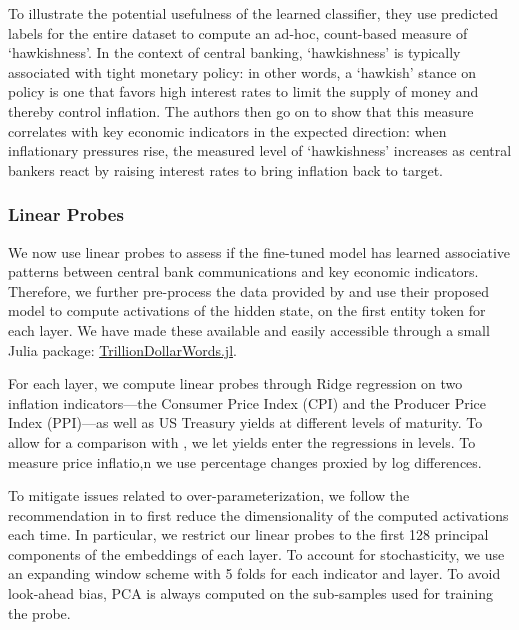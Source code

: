 \documentclass{article}
\theoremstyle{plain}
\theoremstyle{definition}
\theoremstyle{remark}
\begin{document}
To illustrate the potential usefulness of the learned classifier, they use predicted labels for the entire dataset to compute an ad-hoc, count-based measure of `hawkishness'. In the context of central banking, `hawkishness' is typically associated with tight monetary policy: in other words, a `hawkish' stance on policy is one that favors high interest rates to limit the supply of money and thereby control inflation. The authors then go on to show that this measure correlates with key economic indicators in the expected direction: when inflationary pressures rise, the measured level of `hawkishness' increases as central bankers react by raising interest rates to bring inflation back to target.

\subsubsection{Linear Probes}\label{linear-probes}
We now use linear probes to assess if the fine-tuned model has learned associative patterns between central bank communications and key economic indicators. Therefore, we further pre-process the data provided by \citet{shah2023trillion} and use their proposed model to compute activations of the hidden state, on the first entity token for each layer. We have made these available and easily accessible through a small Julia package: \href{https://anonymous.4open.science/r/TrillionDollarWords/README.md}{TrillionDollarWords.jl}. 

For each layer, we compute linear probes through Ridge regression on two inflation indicators---the Consumer Price Index (CPI) and the Producer Price Index (PPI)---as well as US Treasury yields at different levels of maturity. To allow for a comparison with \citet{shah2023trillion}, we let yields enter the regressions in levels. To measure price inflatio,n we use percentage changes proxied by log differences.

To mitigate issues related to over-parameterization, we follow the recommendation in \citet{alain2018understanding} to first reduce the dimensionality of the computed activations each time. In particular, we restrict our linear probes to the first 128 principal components of the embeddings of each layer.
To account for stochasticity, we use an expanding window scheme with 5 folds for each indicator and layer. To avoid look-ahead bias, PCA is always computed on the sub-samples used for training the probe. 
\end{document}
